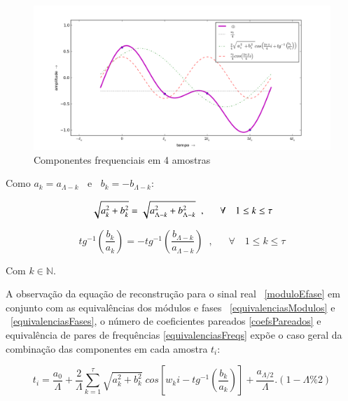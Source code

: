 \begin{figure}[h!]
    \centering
        \includegraphics[width=\textwidth]{figuras/amostras4__}
    \caption{Componentes frequenciais em 4 amostras}
        \label{fig:amostras4}
\end{figure}


Como $a_k = a_{\Lambda -k}\;\;$ e $\;\;b_k = - b_{\Lambda -k}$:

\begin{equation}\label{equivalenciasModulos}
\sqrt{a_k^2 + b_k^2} = \sqrt{a_{\Lambda - k}^2 + b_{\Lambda -k}^2} \;\;, \quad \;\; \forall \quad 1 \leq k \leq \tau  \\
\end{equation}

\begin{equation}\label{equivalenciasFases}
tg^{-1}\left(\frac{b_k}{a_k}\right)=-tg^{-1}\left(\frac{b_{\Lambda -k}}{a_{\Lambda - k}}\right)\;\;,\quad \;\; \forall \quad 1 \leq k \leq \tau
\end{equation}



Com $k \in \mathbb{N}$.

 A observação da equação de reconstrução para o sinal real ~\ref{moduloEfase} em conjunto com as equivalências dos módulos e fases ~\ref{equivalenciasModulos} e ~\ref{equivalenciasFases}, o número de coeficientes pareados \ref{coefsPareados} e equivalência de pares de frequências \ref{equivalenciasFreqs}
expõe o caso geral da combinação das componentes em cada amostra $t_i$:

\begin{equation}
t_i = \frac{a_0}{\Lambda} + \frac{2}{\Lambda}\sum_{k=1}^{\tau}\sqrt{a_k^2 + b_k^2} \; cos\left[w_k i - tg^{-1}\left(\frac{b_k}{a_k}\right)\right]+ \frac{ a_{\Lambda/2}}{\Lambda}.(1-\Lambda\% 2)
\end{equation}


